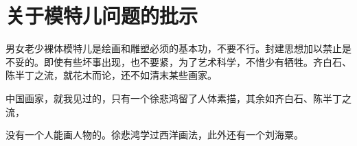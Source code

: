 \section[关于模特儿问题的批示（一九六五年七月十八日）]{关于模特儿问题的批示}


男女老少裸体模特儿是绘画和雕塑必须的基本功，不要不行。封建思想加以禁止是不妥的。即使有些坏事出现，也不要紧，为了艺术科学，不惜少有牺牲。齐白石、陈半丁之流，就花木而论，还不如清末某些画家。

中国画家，就我见过的，只有一个徐悲鸿留了人体素描，其余如齐白石、陈半丁之流，

没有一个人能画人物的。徐悲鸿学过西洋画法，此外还有一个刘海粟。


